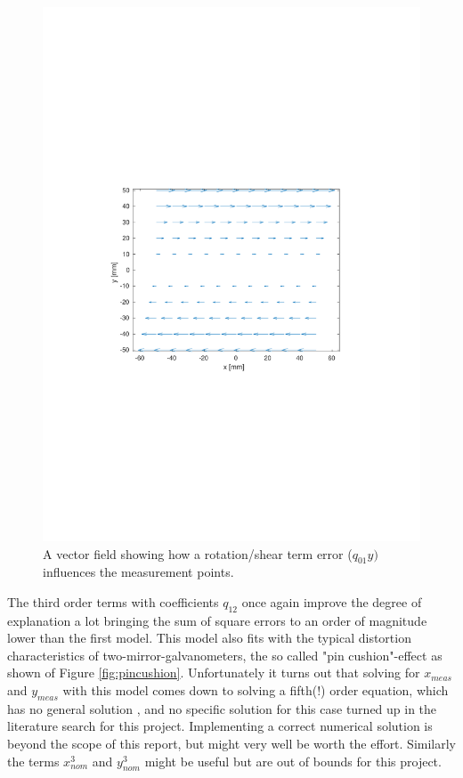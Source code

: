 \begin{figure}[ht]
  \centering
  \includegraphics[clip, trim=3.5cm 8cm 3.5cm 8cm, width=0.72\linewidth]{Pictures/shear.pdf}
  \caption{A vector field showing how a rotation/shear term error ($q_{01}y)$ influences the measurement points.}
  \label{fig:shear}
\end{figure}

The third order terms with coefficients $q_{12}$ once again improve the degree of explanation a lot bringing the sum of square errors to an order of magnitude lower than the first model. This model also fits with the typical distortion characteristics of two-mirror-galvanometers, the so called "pin cushion"-effect \cite[Figure 2.35]{sebastian-phd} as shown of Figure \ref{fig:pincushion}. Unfortunately it turns out that solving for $x_{meas}$ and $y_{meas}$ with this model comes down to solving a fifth(!) order equation, which has no general solution \cite{abel-no-5}, and no specific solution for this case turned up in the literature search for this project. Implementing a correct numerical solution is beyond the scope of this report, but might very well be worth the effort. Similarly the terms $x_{nom}^3$ and $y_{nom}^3$ might be useful but are out of bounds for this project.

